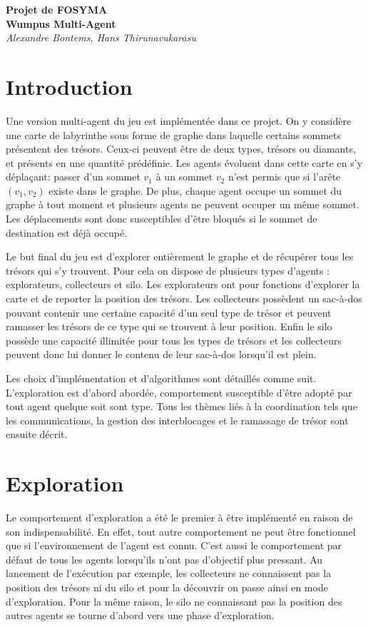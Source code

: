 \documentclass[11pt]{article}
\begin{document}
	
\begin{center}
	\textbf{Projet de FOSYMA\\[.5cm]Wumpus Multi-Agent}\\[.5cm]
	\textit{Alexandre Bontems, Hans Thirunavukarasu}\\
\end{center}

\tableofcontents
\section{Introduction}
Une version multi-agent du jeu  est implémentée dans ce projet. On y considère une carte de labyrinthe sous forme de graphe dans laquelle certains sommets présentent des trésors. Ceux-ci peuvent être de deux types, trésors ou diamants, et présents en une quantité prédéfinie. Les agents évoluent dans cette carte en s'y déplaçant: passer d'un sommet $v_1$ à un sommet $v_2$ n'est permis que si l'arête $(v_1, v_2)$ existe dans le graphe. De plus, chaque agent occupe un sommet du graphe à tout moment et plusieurs agents ne peuvent occuper un même sommet. Les déplacements sont donc susceptibles d'être bloqués si le sommet de destination est déjà occupé.

Le but final du jeu est d'explorer entièrement le graphe et de récupérer tous les trésors qui s'y trouvent. Pour cela on dispose de plusieurs types d'agents : explorateurs, collecteurs et silo. Les explorateurs ont pour fonctions d'explorer la carte et de reporter la position des trésors. Les collecteurs possèdent un sac-à-dos pouvant contenir une certaine capacité d'un seul type de trésor et peuvent ramasser les trésors de ce type qui se trouvent à leur position. Enfin le silo possède une capacité illimitée pour tous les types de trésors et les collecteurs peuvent donc lui donner le contenu de leur sac-à-dos lorsqu'il est plein.

Les choix d'implémentation et d'algorithmes sont détaillés comme suit. L'exploration est d'abord abordée, comportement susceptible d'être adopté par tout agent quelque soit sont type. Tous les thèmes liés à la coordination tels que les communications, la gestion des interblocages et le ramassage de trésor sont ensuite décrit.
\section{Exploration}
Le comportement d'exploration a été le premier à être implémenté en raison de son indispensabilité. En effet, tout autre comportement ne peut être fonctionnel que si l'environnement de l'agent est connu. C'est aussi le comportement par défaut de tous les agents lorsqu'ils n'ont pas d'objectif plus pressant. Au lancement de l'exécution par exemple, les collecteurs ne connaissent pas la position des trésors ni du silo et pour la découvrir on passe ainsi en mode d'exploration. Pour la même raison, le silo ne connaissant pas la position des autres agents se tourne d'abord vers une phase d'exploration.
\end{document}
